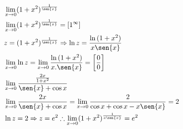 \begin{ex}
\begin{align}
&\lim_{x\rightarrow 0} (1+x^2)^{\frac{1}{\sen{x}}}\nonumber\\
&\lim_{x\rightarrow 0} (1+x^2)^{\frac{1}{\sen{x}}}=[1^{\infty}]\nonumber\\
&z=(1+x^2)^{\frac{1}{\sen{x}}} \Rightarrow \ln{z}=\frac{\ln{(1+x^2)}}{x\sen{x}}\nonumber\\
&\lim_{x\rightarrow 0} \ln{z}=\lim_{x\rightarrow 0} \frac{\ln{(1+x^2)}}{x.\sen{x}}=\left[\frac{0}{0}\right]\nonumber\\
&\lim_{x\rightarrow 0} \frac{\frac{2x}{1+x^2}}{\sen{x}+\cos{x}}\nonumber\\
&\lim_{x\rightarrow 0} \frac{2x}{\sen{x}+\cos{x}}=\lim_{x\rightarrow 0} \frac{2}{\cos{x}+\cos{x}-x\sen{x}}=2\nonumber\\
&\ln{z}=2 \Rightarrow z=e^2 \therefore \lim_{x\rightarrow 0} (1+x^2)^{\frac{1}{x\sen{x}}}=e^2\nonumber
\end{align}
\end{ex}

